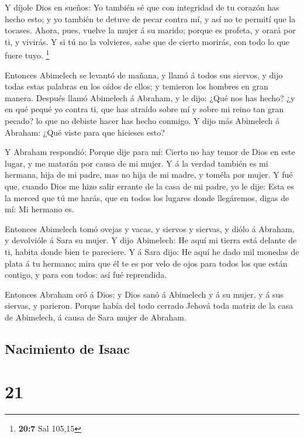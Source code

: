  Y díjole Dios en sueños: Yo también sé que con integridad
de tu corazón has hecho esto; y yo también te detuve de pecar contra mí,
y así no te permití que la tocases.  Ahora, pues, vuelve
la mujer á su marido; porque es profeta, y orará por ti, y vivirás. Y si
tú no la volvieres, sabe que de cierto morirás, con todo lo que fuere
tuyo. \footnote{\textbf{20:7} Sal 105,15}

 Entonces Abimelech se levantó de mañana, y llamó á todos
sus siervos, y dijo todas estas palabras en los oídos de ellos; y
temieron los hombres en gran manera.  Después llamó
Abimelech á Abraham, y le dijo: ¿Qué nos has hecho? ¿y en qué pequé yo
contra ti, que has atraído sobre mí y sobre mi reino tan gran pecado? lo
que no debiste hacer has hecho conmigo.  Y dijo más
Abimelech á Abraham: ¿Qué viste para que hicieses esto?

 Y Abraham respondió: Porque dije para mí: Cierto no hay
temor de Dios en este lugar, y me matarán por causa de mi mujer.
 Y á la verdad también es mi hermana, hija de mi padre,
mas no hija de mi madre, y toméla por mujer.  Y fué que,
cuando Dios me hizo salir errante de la casa de mi padre, yo le dije:
Esta es la merced que tú me harás, que en todos los lugares donde
llegáremos, digas de mí: Mi hermano es.

 Entonces Abimelech tomó ovejas y vacas, y siervos y
siervas, y diólo á Abraham, y devolvióle á Sara su mujer.
 Y dijo Abimelech: He aquí mi tierra está delante de ti,
habita donde bien te pareciere.  Y á Sara dijo: He aquí
he dado mil monedas de plata á tu hermano; mira que él te es por velo de
ojos para todos los que están contigo, y para con todos: así fué
reprendida.

 Entonces Abraham oró á Dios; y Dios sanó á Abimelech y á
su mujer, y á sus siervas, y parieron.  Porque había del
todo cerrado Jehová toda matriz de la casa de Abimelech, á causa de Sara
mujer de Abraham.

\hypertarget{nacimiento-de-isaac}{%
\subsection{Nacimiento de Isaac}\label{nacimiento-de-isaac}}

\hypertarget{section-20}{%
\section{21}\label{section-20}}

